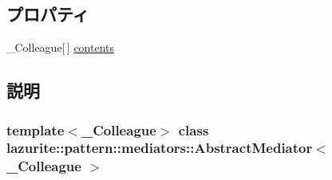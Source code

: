 \subsection*{プロパティ}
\begin{DoxyCompactItemize}
\item 
\_\-Colleague\mbox{[}$\,$\mbox{]} \hyperlink{classlazurite_1_1pattern_1_1mediators_1_1_abstract_mediator_3_01___colleague_01_4_a7e12a0e1943ab3f66a6acc49b54006ad}{contents}
\end{DoxyCompactItemize}


\subsection{説明}
\subsubsection*{template$<$\_\-Colleague$>$ class lazurite::pattern::mediators::AbstractMediator$<$ \_\-Colleague $>$}



